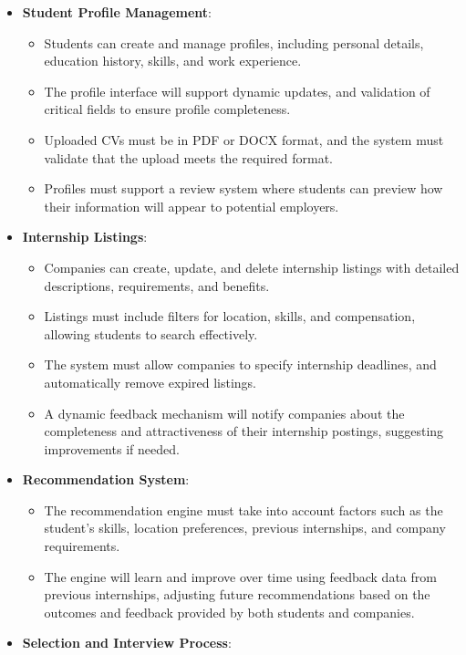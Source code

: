 \begin{itemize}
    \item \textbf{Student Profile Management}: 
        \begin{itemize}
            \item Students can create and manage profiles, including personal details, education history, skills, and work experience.
            \item The profile interface will support dynamic updates, and validation of critical fields to ensure profile completeness.
            \item Uploaded CVs must be in PDF or DOCX format, and the system must validate that the upload meets the required format.
            \item Profiles must support a review system where students can preview how their information will appear to potential employers.
        \end{itemize}
    \item \textbf{Internship Listings}: 
        \begin{itemize}
            \item Companies can create, update, and delete internship listings with detailed descriptions, requirements, and benefits.
            \item Listings must include filters for location, skills, and compensation, allowing students to search effectively.
            \item The system must allow companies to specify internship deadlines, and automatically remove expired listings.
            \item A dynamic feedback mechanism will notify companies about the completeness and attractiveness of their internship postings, suggesting improvements if needed.
        \end{itemize}
    \item \textbf{Recommendation System}: 
        \begin{itemize}
            \item The recommendation engine must take into account factors such as the student’s skills, location preferences, previous internships, and company requirements.
            \item The engine will learn and improve over time using feedback data from previous internships, adjusting future recommendations based on the outcomes and feedback provided by both students and companies.
        \end{itemize}
    \item \textbf{Selection and Interview Process}: 

\end{itemize}
